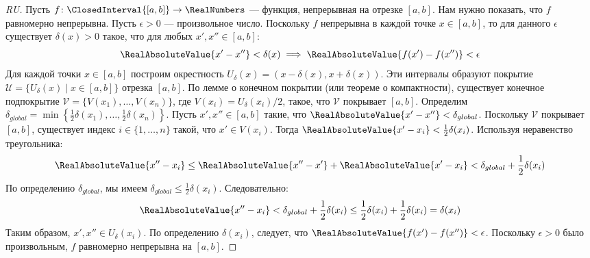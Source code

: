 \begin{proof}[RU]
Пусть $f \colon \ClosedInterval{[a,b]} \to \RealNumbers$ — функция, непрерывная на отрезке $[a, b]$. Нам нужно показать, что $f$ равномерно непрерывна.
Пусть $\epsilon > 0$ — произвольное число.
Поскольку $f$ непрерывна в каждой точке $x \in [a, b]$, то для данного $\epsilon$ существует $\delta(x) > 0$ такое, что для любых $x', x'' \in [a, b]$:
\[ \RealAbsoluteValue{x' - x''} < \delta(x) \implies \RealAbsoluteValue{f(x') - f(x'')} < \epsilon \]
Для каждой точки $x \in [a, b]$ построим окрестность $U_\delta(x) = (x - \delta(x), x + \delta(x))$. Эти интервалы образуют покрытие $\mathcal{U} = \{U_\delta(x) \mid x \in [a, b]\}$ отрезка $[a, b]$.
По лемме о конечном покрытии (или теореме о компактности), существует конечное подпокрытие $\mathcal{V} = \{V(x_1), \dots, V(x_n)\}$, где $V(x_i) = U_\delta(x_i)/2$, такое, что $\mathcal{V}$ покрывает $[a, b]$.
Определим $\delta_{global} = \min \left\{ \frac{1}{2}\delta(x_1), \dots, \frac{1}{2}\delta(x_n) \right\}$.
Пусть $x', x'' \in [a, b]$ такие, что $\RealAbsoluteValue{x' - x''} < \delta_{global}$.
Поскольку $\mathcal{V}$ покрывает $[a, b]$, существует индекс $i \in \{1, \dots, n\}$ такой, что $x' \in V(x_i)$.
Тогда $\RealAbsoluteValue{x' - x_i} < \frac{1}{2}\delta(x_i)$.
Используя неравенство треугольника:
\[ \RealAbsoluteValue{x'' - x_i} \leq \RealAbsoluteValue{x'' - x'} + \RealAbsoluteValue{x' - x_i} < \delta_{global} + \frac{1}{2}\delta(x_i) \]
По определению $\delta_{global}$, мы имеем $\delta_{global} \leq \frac{1}{2}\delta(x_i)$. Следовательно:
\[ \RealAbsoluteValue{x'' - x_i} < \delta_{global} + \frac{1}{2}\delta(x_i) \leq \frac{1}{2}\delta(x_i) + \frac{1}{2}\delta(x_i) = \delta(x_i) \]
Таким образом, $x', x'' \in U_\delta(x_i)$.
По определению $\delta(x_i)$, следует, что $\RealAbsoluteValue{f(x') - f(x'')} < \epsilon$.
Поскольку $\epsilon > 0$ было произвольным, $f$ равномерно непрерывна на $[a, b]$.
\end{proof}

